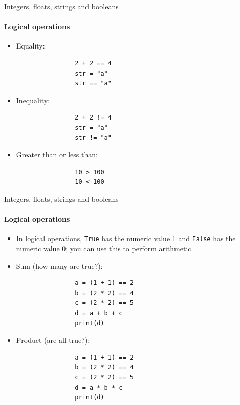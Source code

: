 \documentclass[notes,11pt, aspectratio=169, xcolor=table]{beamer}
\begin{document}
    \begin{frame}[fragile=singleslide]{Integers, floats, strings and booleans}
    \framesubtitle{Logical operations}

        \begin{itemize}
            \item Equality:
                \begin{verbatim}
                2 + 2 == 4
                str = "a"
                str == "a"
                \end{verbatim}    
            \item Inequality:
                \begin{verbatim}
                2 + 2 != 4
                str = "a"
                str != "a"
                \end{verbatim}    
            \item Greater than or less than:
                \begin{verbatim}
                10 > 100
                10 < 100
                \end{verbatim}    
        \end{itemize}

    \end{frame}              
    
        \begin{frame}[fragile=singleslide]{Integers, floats, strings and booleans}
    \framesubtitle{Logical operations}

        \begin{itemize}
            \item In logical operations, \texttt{True} has the numeric value 1 and \texttt{False} has the numeric value 0; you can use this to perform arithmetic.
            \item Sum (how many are true?):
                \begin{verbatim}
                a = (1 + 1) == 2
                b = (2 * 2) == 4
                c = (2 * 2) == 5
                d = a + b + c
                print(d)
                \end{verbatim}    
            \item Product (are all true?):
                \begin{verbatim}
                a = (1 + 1) == 2
                b = (2 * 2) == 4
                c = (2 * 2) == 5
                d = a * b * c
                print(d)
                \end{verbatim}    
        \end{itemize}

    \end{frame}              
    
\end{document}
